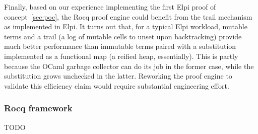 \documentclass[a4paper, 11pt]{book}
\begin{document}
Finally, based on our experience implementing the first Elpi proof of
concept~\cref{sec:poc}, the Rocq proof engine could benefit from the trail
mechanism as implemented in Elpi. It turns out that, for a typical Elpi
workload, mutable terms and a trail (a log of mutable cells to unset upon
backtracking) provide much better performance than immutable terms paired with
a substitution implemented as a functional map (a reified heap, essentially).
This is partly because the OCaml garbage collector can do its job in the former
case, while the substitution grows unchecked in the latter. Reworking the proof
engine to validate this efficiency claim would require substantial engineering
effort.

\subsubsection{Rocq framework}

TODO

\printbibliography[title={Our Bibliography}, keyword=me]
\printbibliography[title={Bibliography}, keyword=they]
\end{document}

